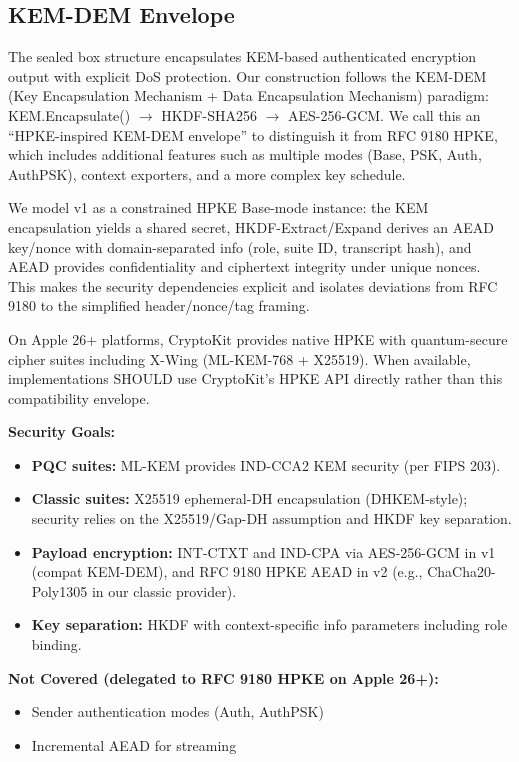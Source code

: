 \documentclass[10pt,journal,compsoc]{IEEEtran}
\providecommand{\tightlist}{%
	  \setlength{\itemsep}{0pt}\setlength{\parskip}{0pt}}
\begin{document}
\subsection*{KEM-DEM Envelope}

The sealed box structure encapsulates KEM-based authenticated encryption
output with explicit DoS protection. Our construction follows the
KEM-DEM (Key Encapsulation Mechanism + Data Encapsulation Mechanism)
paradigm: KEM.Encapsulate() $\rightarrow$ HKDF-SHA256 $\rightarrow$
AES-256-GCM. We call this an ``HPKE-inspired KEM-DEM envelope'' to
distinguish it from RFC 9180 HPKE, which includes additional features
such as multiple modes (Base, PSK, Auth, AuthPSK), context exporters,
and a more complex key schedule.

We model v1 as a constrained HPKE Base-mode instance: the KEM
encapsulation yields a shared secret, HKDF-Extract/Expand derives an
AEAD key/nonce with domain-separated info (role, suite ID, transcript
hash), and AEAD provides confidentiality and ciphertext integrity under
unique nonces. This makes the security dependencies explicit and
isolates deviations from RFC 9180 to the simplified header/nonce/tag
framing.

On Apple 26+ platforms, CryptoKit provides native HPKE with
quantum-secure cipher suites including X-Wing (ML-KEM-768 + X25519).
When available, implementations SHOULD use CryptoKit's HPKE API directly
rather than this compatibility envelope.

\textbf{Security Goals:}
\begin{itemize}\tightlist
\item
  \textbf{PQC suites:} ML-KEM provides IND-CCA2 KEM security (per FIPS
  203).
\item
  \textbf{Classic suites:} X25519 ephemeral-DH encapsulation
  (DHKEM-style); security relies on the X25519/Gap-DH assumption and
  HKDF key separation.
\item
  \textbf{Payload encryption:} INT-CTXT and IND-CPA via AES-256-GCM in v1
  (compat KEM-DEM), and RFC 9180 HPKE AEAD in v2 (e.g.,
  ChaCha20-Poly1305 in our classic provider).
\item
  \textbf{Key separation:} HKDF with context-specific info parameters
  including role binding.
\end{itemize}

\textbf{Not Covered (delegated to RFC 9180 HPKE on Apple 26+):}
\begin{itemize}\tightlist
\item
  Sender authentication modes (Auth, AuthPSK)
\item
  Incremental AEAD for streaming
\end{itemize}
\end{document}
